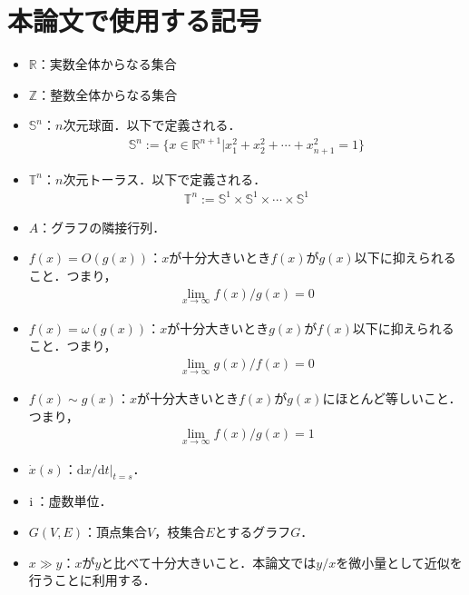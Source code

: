 \documentclass[../main]{subfiles}
\begin{document}
\chapter*{本論文で使用する記号}
\begin{itemize}
    \item
    $\mathbb{R}$：実数全体からなる集合
    \item
    $\mathbb{Z}$：整数全体からなる集合
    \item
    $\mathbb{S}^n$：$n$次元球面．以下で定義される．
    \begin{align*}
        \mathbb{S}^n:=\{x\in\mathbb{R}^{n+1}|x_1^2+x_2^2+\cdots+x_{n+1}^2=1\}
    \end{align*}    
    \item
    $\mathbb{T}^n$：$n$次元トーラス．以下で定義される．
    \begin{align*}
        \mathbb{T}^n:=\mathbb{S}^1\times\mathbb{S}^1\times \cdots\times \mathbb{S}^1
    \end{align*}
    \item 
    $A$：グラフの隣接行列．
    \item
    $f(x)=O(g(x))$：$x$が十分大きいとき$f(x)$が$g(x)$以下に抑えられること．つまり，
    \begin{align*}
        \lim_{x\to\infty}f(x)/g(x)=0
    \end{align*}
    \item
    $f(x)=\omega(g(x))$：$x$が十分大きいとき$g(x)$が$f(x)$以下に抑えられること．つまり，
    \begin{align*}
        \lim_{x\to\infty}g(x)/f(x)=0
    \end{align*}
    \item
    $f(x)\sim g(x)$：$x$が十分大きいとき$f(x)$が$g(x)$にほとんど等しいこと．つまり，
    \begin{align*}
        \lim_{x\to\infty}f(x)/g(x)=1
    \end{align*}    
    \item
    $\dot{x}(s)$：$\mathrm{d}x/\mathrm{d}t|_{t=s}$．
    \item
    ${\mathrm i\,}$：虚数単位．
    \item
    $G(V,E)$：頂点集合$V$，枝集合$E$とするグラフ$G$．
    \item
    $x\gg y$：$x$が$y$と比べて十分大きいこと．本論文では$y/x$を微小量として近似を行うことに利用する．
\end{itemize}
\end{document}
